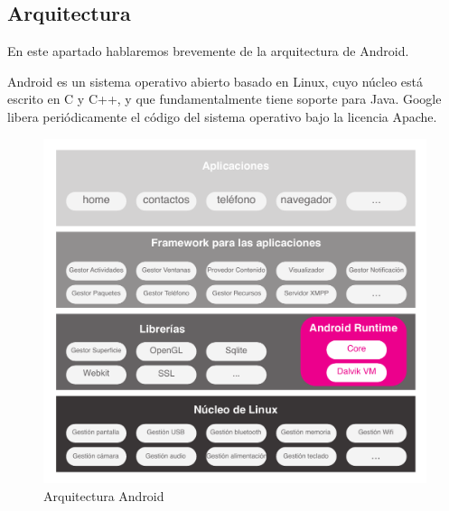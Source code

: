 \subsection{Arquitectura}
En este apartado hablaremos brevemente de la arquitectura de Android.\par
Android es un sistema operativo abierto basado en Linux, cuyo núcleo está escrito en C y C++, y que fundamentalmente tiene soporte para Java. Google libera periódicamente el código del sistema operativo bajo la licencia Apache.\par 
\begin{figure}[ht]
\centering
\includegraphics[scale=0.8]{./imgs/esquemas/arquitectura.pdf}
\caption{Arquitectura Android}
\label{fig:arquitectura_android}
\end{figure}

